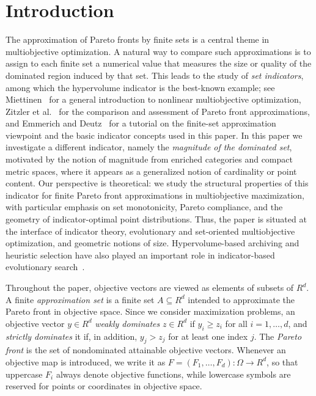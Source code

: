 \documentclass{article}
\def\R{R}%
\theoremstyle{definition}
\newcommand{\R}{\mathbb{R}}
\newcommand{\1}{\mathbf{1}}
\begin{document}
\section{Introduction}
The approximation of Pareto fronts by finite sets is a central theme in multiobjective optimization. A natural way to compare such approximations is to assign to each finite set a numerical value that measures the size or quality of the dominated region induced by that set. This leads to the study of \emph{set indicators}, among which the hypervolume indicator is the best-known example; see Miettinen~\cite{Miettinen1999} for a general introduction to nonlinear multiobjective optimization, Zitzler et al.~\cite{Zitzler2003} for the comparison and assessment of Pareto front approximations, and Emmerich and Deutz~\cite{EmmerichDeutz2018} for a tutorial on the finite-set approximation viewpoint and the basic indicator concepts used in this paper. In this paper we investigate a different indicator, namely the \emph{magnitude of the dominated set}, motivated by the notion of magnitude from enriched categories and compact metric spaces, where it appears as a generalized notion of cardinality or point content. Our perspective is theoretical: we study the structural properties of this indicator for finite Pareto front approximations in multiobjective maximization, with particular emphasis on set monotonicity, Pareto compliance, and the geometry of indicator-optimal point distributions. Thus, the paper is situated at the interface of indicator theory, evolutionary and set-oriented multiobjective optimization, and geometric notions of size. Hypervolume-based archiving and heuristic selection have also played an important role in indicator-based evolutionary search~\cite{KnowlesCorneFleischer2003,Fleischer2003}.

Throughout the paper, objective vectors are viewed as elements of subsets of \(\R^d\). A finite \emph{approximation set} is a finite set \(A\subseteq \R^d\) intended to approximate the Pareto front in objective space. Since we consider maximization problems, an objective vector \(y\in\R^d\) \emph{weakly dominates} \(z\in\R^d\) if \(y_i\ge z_i\) for all \(i=1,\dots,d\), and \emph{strictly dominates} it if, in addition, \(y_j>z_j\) for at least one index \(j\). The \emph{Pareto front} is the set of nondominated attainable objective vectors. Whenever an objective map is introduced, we write it as \(F=(F_1,\dots,F_d):\Omega	\rightarrow \R^d\), so that uppercase \(F_i\) always denote objective functions, while lowercase symbols are reserved for points or coordinates in objective space.
\end{document}
